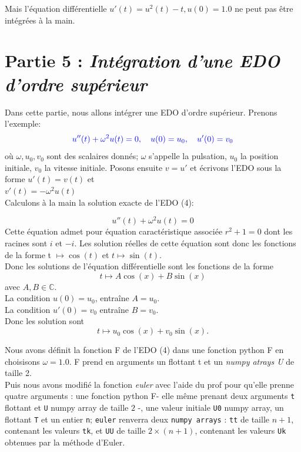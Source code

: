 \documentclass{article}
\begin{document}
Mais l'équation différentielle $u'(t) =  u^2(t) - t,  u(0)  =  1.0$ ne peut pas être intégrées à la main.\\


\section{{\color{red}Partie 5 :} \textit{Intégration d'une EDO d'ordre supérieur}}

Dans cette partie, nous allons intégrer une EDO d'ordre supérieur. Prenons l'exemple:\\
\begin{equation}
\label{harmo_2}
\color{blue}u''(t) + \omega^2 u(t) = 0, \quad u(0) = u_0, \quad u'(0) = v_0 
\end{equation}
où $\omega, u_0, v_0$ sont des scalaires donnés; $\omega$ s'appelle la pulsation, $u_0$ la position initiale, $v_0$ la vitesse initiale.
Posons ensuite $v = u'$ et écrivons l'EDO sous la forme
$u'(t) =  v(t)$ et  \\
$v'(t) =  -\omega^2u(t)$ \\


Calculons à la main la solution exacte de l'EDO (4):

$$ u''(t) + \omega^2 u(t) = 0 $$ 
Cette équation admet pour équation caractéristique associée $r^2 +1 = 0$ dont les racines sont $i$ et $-i$. Les solution réelles de cette équation sont donc les fonctions de la forme t $\mapsto \cos(t)$ et $t \mapsto \sin(t)$. \\
Donc les solutions de l'équation différentielle sont les fonctions de la forme 
$$ t \mapsto A \cos(x) + B \sin(x)$$ avec $A,B \in \mathbb{C}$. \\
La condition  $u(0) = u_0$, entraîne $A = u_0 $.\\
La condition $ u'(0) = v_0 $ entraîne $B = v_0 $.\\
 Donc les solution sont $$  t \mapsto  u_0 \cos(x) + v_0 \sin(x). $$

Nous avons définit la fonction F de l'EDO (4) dans une fonction python F en choisisons $\omega = 1.0$. F prend en arguments un flottant t et un \textit{numpy atrays U} de taille 2. \\

Puis nous avons modifié la fonction \textit{euler} avec l'aide du prof pour qu'elle prenne quatre arguments : une fonction python F- elle même prenant deux arguments \texttt{t} flottant et \texttt{U} numpy array de taille $2$ -, une valeur initiale \texttt{U0} numpy array, un flottant \texttt{T} et un entier \texttt{n}; \texttt{euler} renverra deux \texttt{numpy arrays} :  \texttt{tt} de taille $n+1$, contenant les valeurs \texttt{tk}, et \texttt{UU} de taille $2\times (n+1)$, contenant les valeurs \texttt{Uk} obtenues par la méthode d'Euler.\\
\end{document}
